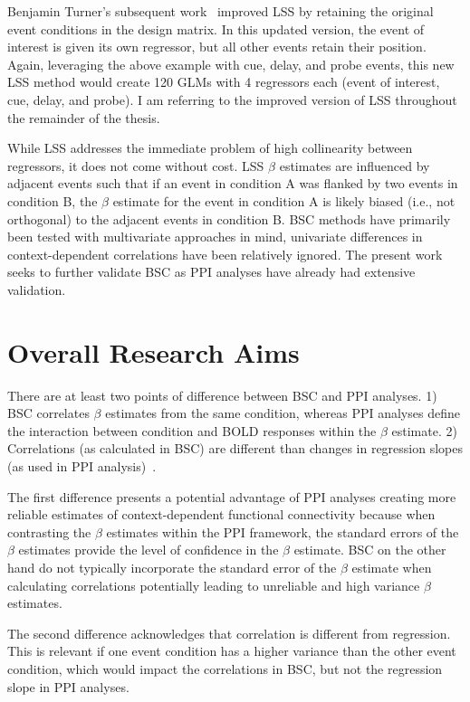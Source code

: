 \documentclass[phd,appendix,figures]{uithesis}
\begin{document}
Benjamin Turner's subsequent work~\cite{Turner2012a} improved LSS by retaining
the original event conditions in the design matrix.
In this updated version, the event of interest is given its own regressor, but all
other events retain their position.
Again, leveraging the above example with cue, delay, and probe events,
this new LSS method would create 120 GLMs with 4 regressors each (event of interest, cue, delay, and probe).
I am referring to the improved version of LSS throughout the remainder of the thesis.

While LSS addresses the immediate problem of high collinearity between regressors,
it does not come without cost.
LSS $\beta$ estimates are influenced by adjacent events such that if an event in condition A
was flanked by two events in condition B, the $\beta$ estimate for the event in condition A
is likely biased (i.e., not orthogonal) to the adjacent events in condition B.
BSC methods have primarily been tested with multivariate approaches in mind, univariate
differences in context-dependent correlations have been relatively ignored.
The present work seeks to further validate BSC as PPI analyses have already had
extensive validation.

\section{Overall Research Aims}

There are at least two points of difference between BSC and PPI analyses.
1) BSC correlates $\beta$ estimates from the same condition, whereas PPI analyses define
the interaction between condition and BOLD responses within the $\beta$ estimate.
2) Correlations (as calculated in BSC) are different than changes in regression slopes
(as used in PPI analysis)~\cite{Di2019}.

The first difference presents a potential advantage of PPI analyses creating more reliable
estimates of context-dependent functional connectivity because when contrasting the $\beta$ estimates
within the PPI framework, the standard errors of the $\beta$ estimates provide the level of
confidence in the $\beta$ estimate.
BSC on the other hand do not typically incorporate the standard error of the $\beta$ estimate
when calculating correlations potentially leading to unreliable and high variance $\beta$
estimates.

The second difference acknowledges that correlation is different from regression.
This is relevant if one event condition has a higher variance than the other event condition,
which would impact the correlations in BSC, but not the regression slope in PPI analyses.
\end{document}
